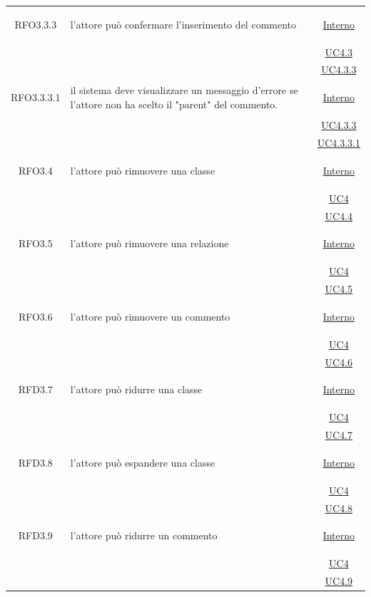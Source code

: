 \begin{longtable}{|c|>{\centering}m{7cm}|c|}
\hypertarget{RFO3.3.3}{RFO3.3.3} & l'attore può confermare l'inserimento del commento & \hyperlink{Interno}{Interno}\\
& &\hyperref[UC4.3]{UC4.3}\\
& &\hyperref[UC4.3.3]{UC4.3.3}\\ \hline

\hypertarget{RFO3.3.3.1}{RFO3.3.3.1} & il sistema deve visualizzare un messaggio d'errore se l'attore non ha scelto il "parent" del commento. & \hyperlink{Interno}{Interno}\\
& &\hyperref[UC4.3.3]{UC4.3.3}\\
& &\hyperref[UC4.3.3.1]{UC4.3.3.1}\\ \hline

\hypertarget{RFO3.4}{RFO3.4} & l'attore può rimuovere una classe &  \hyperlink{Interno}{Interno}\\
& &\hyperref[UC4]{UC4}\\
& &\hyperref[UC4.4]{UC4.4}\\ \hline

\hypertarget{RFO3.5}{RFO3.5} & l'attore può rimuovere una relazione &  \hyperlink{Interno}{Interno}\\
& &\hyperref[UC4]{UC4}\\
& &\hyperref[UC4.5]{UC4.5}\\ \hline

\hypertarget{RFO3.6}{RFO3.6} & l'attore può rimuovere un commento &  \hyperlink{Interno}{Interno}\\
& &\hyperref[UC4]{UC4}\\
& &\hyperref[UC4.6]{UC4.6}\\ \hline

\hypertarget{RFD3.7}{RFD3.7} & l'attore può ridurre una classe &  \hyperlink{Interno}{Interno}\\
& &\hyperref[UC4]{UC4}\\
& &\hyperref[UC4.7]{UC4.7}\\ \hline

\hypertarget{RFD3.8}{RFD3.8} & l'attore può espandere una classe &  \hyperlink{Interno}{Interno}\\
& &\hyperref[UC4]{UC4}\\
& &\hyperref[UC4.8]{UC4.8}\\ \hline

\hypertarget{RFD3.9}{RFD3.9} & l'attore può ridurre un commento &  \hyperlink{Interno}{Interno}\\
& &\hyperref[UC4]{UC4}\\
& &\hyperref[UC4.9]{UC4.9}\\ \hline


\end{longtable}

